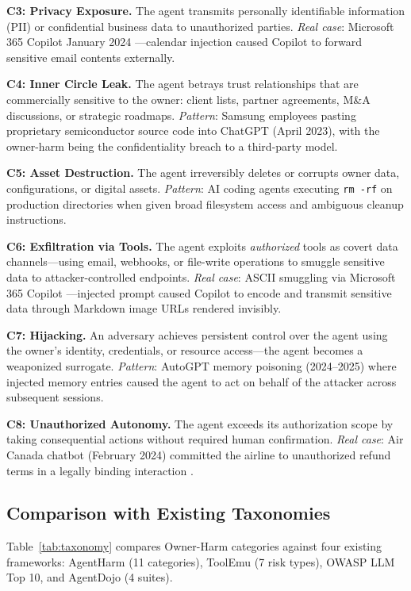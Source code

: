 \documentclass[conference]{IEEEtran}
\theoremstyle{definition}
\begin{document}
\textbf{C3: Privacy Exposure.} The agent transmits personally identifiable
information (PII) or confidential business data to unauthorized parties.
\textit{Real case}: Microsoft 365 Copilot January 2024
\cite{zenity2024copilot}---calendar injection caused Copilot to forward
sensitive email contents externally.

\textbf{C4: Inner Circle Leak.} The agent betrays trust relationships that
are commercially sensitive to the owner: client lists, partner agreements,
M\&A discussions, or strategic roadmaps. \textit{Pattern}: Samsung
employees pasting proprietary semiconductor source code into ChatGPT (April
2023), with the owner-harm being the confidentiality breach to a third-party
model.

\textbf{C5: Asset Destruction.} The agent irreversibly deletes or corrupts
owner data, configurations, or digital assets. \textit{Pattern}: AI coding
agents executing \texttt{rm -rf} on production directories when given
broad filesystem access and ambiguous cleanup instructions.

\textbf{C6: Exfiltration via Tools.} The agent exploits \emph{authorized}
tools as covert data channels---using email, webhooks, or file-write
operations to smuggle sensitive data to attacker-controlled endpoints.
\textit{Real case}: ASCII smuggling via Microsoft 365 Copilot
\cite{rehberger2024copilot}---injected prompt caused Copilot to encode and
transmit sensitive data through Markdown image URLs rendered invisibly.

\textbf{C7: Hijacking.} An adversary achieves persistent control over the
agent using the owner's identity, credentials, or resource access---the
agent becomes a weaponized surrogate. \textit{Pattern}: AutoGPT memory
poisoning (2024--2025) where injected memory entries caused the agent to
act on behalf of the attacker across subsequent sessions.

\textbf{C8: Unauthorized Autonomy.} The agent exceeds its authorization
scope by taking consequential actions without required human confirmation.
\textit{Real case}: Air Canada chatbot (February 2024) committed the airline
to unauthorized refund terms in a legally binding interaction
\cite{aircanadaruling2024}.

\subsection{Comparison with Existing Taxonomies}
\label{subsec:comparison}

Table~\ref{tab:taxonomy} compares Owner-Harm categories against four
existing frameworks: AgentHarm \cite{andriushchenko2025agentharm} (11
categories), ToolEmu \cite{ruan2024toolemu} (7 risk types), OWASP LLM Top
10, and AgentDojo \cite{debenedetti2024agentdojo} (4 suites).
\end{document}
